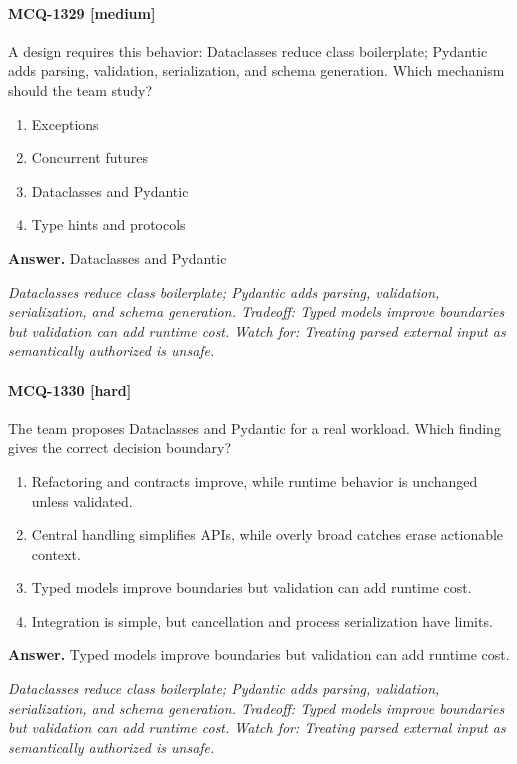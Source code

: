 \paragraph{MCQ-1329 [medium]} A design requires this behavior: Dataclasses reduce class boilerplate; Pydantic adds parsing, validation, serialization, and schema generation. Which mechanism should the team study?
\begin{enumerate}[label=\Alph*.]
\item Exceptions
\item Concurrent futures
\item Dataclasses and Pydantic
\item Type hints and protocols
\end{enumerate}
\noindent\textbf{Answer.} Dataclasses and Pydantic
\par\textit{Dataclasses reduce class boilerplate; Pydantic adds parsing, validation, serialization, and schema generation. Tradeoff: Typed models improve boundaries but validation can add runtime cost. Watch for: Treating parsed external input as semantically authorized is unsafe.}
\paragraph{MCQ-1330 [hard]} The team proposes Dataclasses and Pydantic for a real workload. Which finding gives the correct decision boundary?
\begin{enumerate}[label=\Alph*.]
\item Refactoring and contracts improve, while runtime behavior is unchanged unless validated.
\item Central handling simplifies APIs, while overly broad catches erase actionable context.
\item Typed models improve boundaries but validation can add runtime cost.
\item Integration is simple, but cancellation and process serialization have limits.
\end{enumerate}
\noindent\textbf{Answer.} Typed models improve boundaries but validation can add runtime cost.
\par\textit{Dataclasses reduce class boilerplate; Pydantic adds parsing, validation, serialization, and schema generation. Tradeoff: Typed models improve boundaries but validation can add runtime cost. Watch for: Treating parsed external input as semantically authorized is unsafe.}
